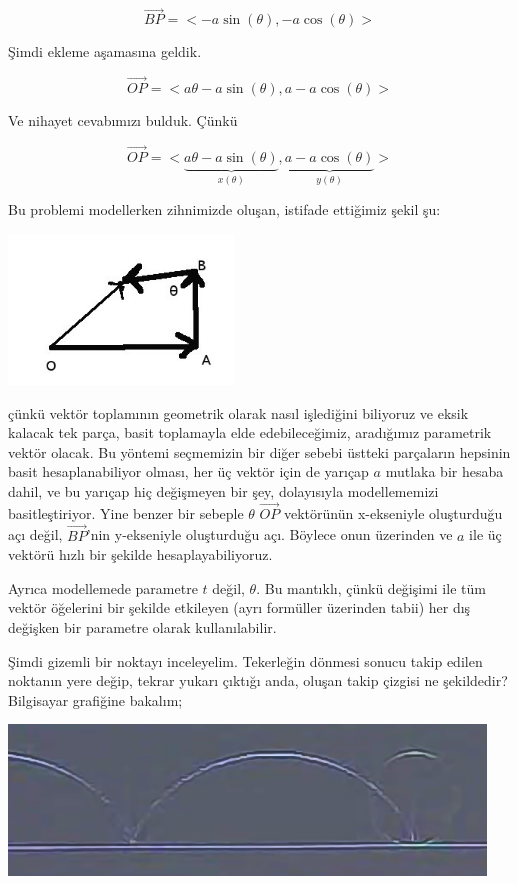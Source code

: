 \documentclass[12pt,fleqn]{article}\usepackage{../../common}
\begin{document}
$$ \vec{BP} = <-a\sin(\theta), -a\cos(\theta)> $$

Şimdi ekleme aşamasına geldik. 

$$ \vec{OP} = < a\theta - a\sin(\theta), a-a\cos(\theta) > $$

Ve nihayet cevabımızı bulduk. Çünkü 

$$ \vec{OP} = 
< \underbrace{a\theta - a\sin(\theta)}_{x(\theta)}, 
\underbrace{a-a\cos(\theta)}_{y(\theta)} > $$

Bu problemi modellerken zihnimizde oluşan, istifade ettiğimiz şekil şu:

\begin{center}
\includegraphics[height=4cm]{cycloid-lines.png}
\end{center}

çünkü vektör toplamının geometrik olarak nasıl işlediğini biliyoruz ve eksik
kalacak tek parça, basit toplamayla elde edebileceğimiz, aradığımız parametrik
vektör olacak. Bu yöntemi seçmemizin bir diğer sebebi üstteki parçaların
hepsinin basit hesaplanabiliyor olması, her üç vektör için de yarıçap $a$
mutlaka bir hesaba dahil, ve bu yarıçap hiç değişmeyen bir şey, dolayısıyla
modellememizi basitleştiriyor. Yine benzer bir sebeple $\theta$ $\vec{OP}$
vektörünün x-ekseniyle oluşturduğu açı değil, $\vec{BP}$'nin y-ekseniyle
oluşturduğu açı. Böylece onun üzerinden ve $a$ ile üç vektörü hızlı bir şekilde
hesaplayabiliyoruz.

Ayrıca modellemede parametre $t$ değil, $\theta$. Bu mantıklı, çünkü değişimi
ile tüm vektör öğelerini bir şekilde etkileyen (ayrı formüller üzerinden tabii)
her dış değişken bir parametre olarak kullanılabilir.

Şimdi gizemli bir noktayı inceleyelim. Tekerleğin dönmesi sonucu takip edilen
noktanın yere değip, tekrar yukarı çıktığı anda, oluşan takip çizgisi ne
şekildedir? Bilgisayar grafiğine bakalım;

\begin{center}
\includegraphics[height=4cm]{5_7.png}
\end{center}
\end{document}
